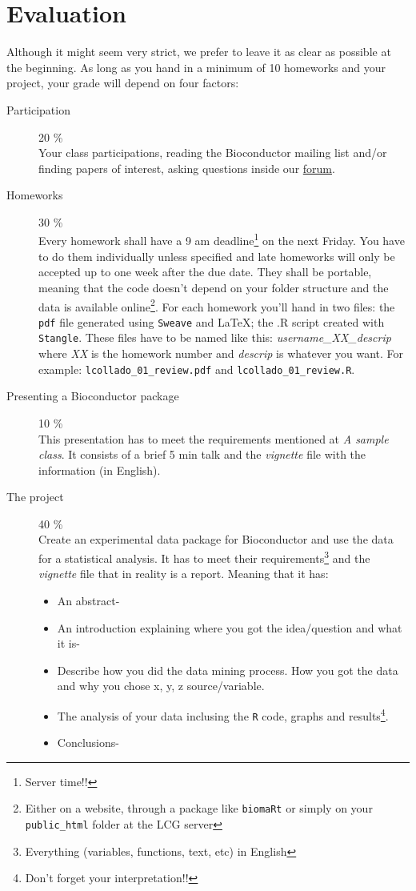 \documentclass[letterpaper,12pt]{article}
\newcommand{\pl}[1]{\texttt{#1}}
\newcommand{\myurlshort}[2]{\href{http://#1}{{\textsf{#2}}}}
\begin{document}
\section{Evaluation}
Although it might seem very strict, we prefer to leave it as clear as possible at the beginning. As long as you hand in a minimum of 10 homeworks and your project, your grade will depend on four factors:
  \begin{description}
  \item[Participation] 20 \% \\Your class participations, reading the Bioconductor mailing list and/or finding papers of interest, asking questions inside our \myurlshort{foros.nnb.unam.mx/viewforum.php?f=111}{forum}.
  \item[Homeworks] 30 \% \\Every homework shall have a 9 am deadline\footnote{Server time!!} on the next Friday. You have to do them individually unless specified and late homeworks will only be accepted up to one week after the due date. They shall be portable, meaning that the code doesn't depend on your folder structure and the data is available online\footnote{Either on a website, through a package like \pl{biomaRt} or simply on your \pl{public\_html} folder at the LCG server}. For each homework you'll hand in two files: the \pl{pdf} file generated using \pl{Sweave} and \LaTeX; the .R script created with \pl{Stangle}. These files have to be named like this: \emph{username\_XX\_descrip} where \emph{XX} is the homework number and \emph{descrip} is whatever you want. For example: \pl{lcollado\_01\_review.pdf} and \pl{lcollado\_01\_review.R}.
  \item[Presenting a Bioconductor package] 10 \% \\This presentation has to meet the requirements mentioned at \emph{A sample class}. It consists of a brief 5 min talk and the \emph{vignette} file with the information (in English). 
  \item[The project] 40 \% \\ Create an experimental data package for Bioconductor and use the data for a statistical analysis. It has to meet their requirements\footnote{Everything (variables, functions, text, etc) in English} and the \emph{vignette} file that in reality is a report. Meaning that it has:
  \begin{itemize}
  \item An abstract-
  \item An introduction explaining where you got the idea/question and what it is-
  \item Describe how you did the data mining process. How you got the data and why you chose x, y, z source/variable.
  \item The analysis of your data inclusing the \pl{R} code, graphs and results\footnote{Don't forget your interpretation!!}.
  \item Conclusions-
  \end{itemize}
  \end{description}
\end{document}
